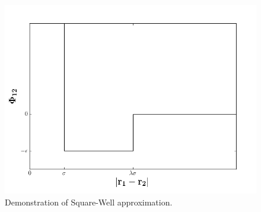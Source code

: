 \documentclass[12pt]{article}
\begin{document}
\begin{figure}
    \centering
    \includegraphics[width=.75\textwidth]{SWF-E.png}
    \caption{Demonstration of Square-Well approximation.}
    \label{sw_phi}
\end{figure}
\end{document}
